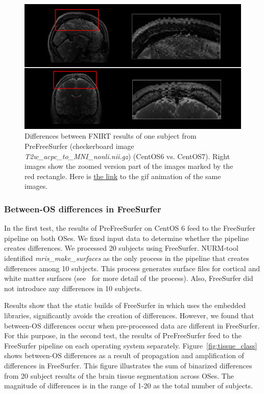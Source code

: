 \documentclass[a4paper,num-refs]{oup-contemporary}
\begin{document}
\begin{figure}
  \centering
    \includegraphics[width=\columnwidth]{images/segmentation.png} 
    \caption{Differences between FNIRT results of one subject from PreFreeSurfer 
    (checkerboard image \emph{T2w\_acpc\_to\_MNI\_nonli.nii.gz}) (CentOS6 vs. 
    CentOS7). Right images show the zoomed version part of the images marked 
    by the red rectangle.
    Here is 
    \href{https://raw.githubusercontent.com/ali4006/HCP-reproducibility-paper/master/images/brain_classification.gif}{the link}
    to the gif animation of the same images.
} 
    \label{fig:fnirt_result}
\end{figure}


\subsubsection{Between-OS differences in FreeSurfer} 

In the first test, the results of PreFreeSurfer on CentOS 6
feed to the FreeSurfer pipeline on both OSes. 
We fixed input data to determine whether the pipeline creates differences.
We processed 20 subjects using FreeSurfer.
NURM-tool identified \emph{mris\_make\_surfaces} as the only process in 
the pipeline that creates differences among 10 subjects.
This process generates surface files for cortical and white matter surfaces 
(see~\cite{fischl2012freesurfer} for more detail of the process). 
Also, FreeSurfer did not introduce any differences in 10 subjects. 

Results show that the static builds of FreeSurfer in which uses the embedded libraries, 
significantly avoids the creation of differences.
However, we found that between-OS differences occur when pre-processed data are different in FreeSurfer. 
For this purpose, in the second test, the results of PreFreeSurfer feed to the FreeSurfer 
pipeline on each operating system separately.
Figure~\ref{fig:tissue_class} shows between-OS differences  
as a result of propagation and amplification of differences in FreeSurfer. %
This figure illustrates the sum of binarized differences 
from 20 subject results of the brain tissue segmentation across OSes.
The magnitude of differences is in the range of 1-20 as the total number of subjects.
\end{document}

